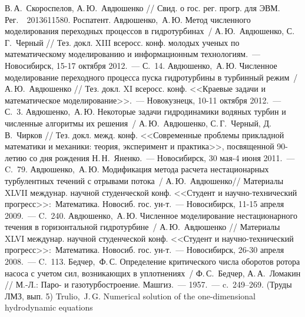 \begin{thebibliography}{999}
               В.\,А.~Скороспелов, А.\,Ю.~Авдюшенко // Свид. о гос. рег. прогр. для ЭВМ. 
               Рег.~\No~2013611580. Роспатент.
\Rus
{} Авдюшенко,~А.\,Ю. Метод численного моделирования переходных 
               процессов в гидротурбинах~/ А.\,Ю.~Авдюшенко, С.\,Г.~Черный //
               Тез. докл. XIII всеросс. конф. молодых ученых по математическому моделированию и информационным 
               технологиям.~--- Новосибирск, 15-17 октября 2012.~--- С.~14.
\Rus
{} Авдюшенко,~А.\,Ю. Численное моделирование переходного процесса пуска гидротурбины 
               в турбинный режим~/ А.\,Ю.~Авдюшенко // 
               Тез. докл. XI всеросс. конф. <<Краевые задачи и математическое моделирование>>.~--- 
               Новокузнецк, 10-11 октября 2012.~--- С.~3. 
\Rus
{} Авдюшенко,~А.\,Ю. Некоторые задачи гидродинамики водяных турбин и численные алгоритмы 
               их решения~/ А.\,Ю.~Авдюшенко, С.\,Г.~Черный, Д.\,В.~Чирков //  Тез. докл. межд. 
               конф. <<Современные проблемы прикладной математики и 
               механики: теория, эксперимент и практика>>, посвященной 90-летию со дня 
               рождения Н.\,Н.~Яненко.~--- Новосибирск, 30 мая-4 июня 2011.~--- C.~79. 
\Rus
{} Авдюшенко,~А.\,Ю. Модификация метода расчета нестационарных турбулентных течений 
               с отрывами потока~/ А.\,Ю.~Авдюшенко// Материалы XLVII междунар. научной студенческой 
               конф. <<Студент и научно-технический прогресс>>:~Математика. Новосиб. гос. ун-т.~--- 
               Новосибирск, 11-15 апреля 2009.~--- C.~240.           
\Rus
{} Авдюшенко,~А.\,Ю. Численное моделирование нестационарного течения в 
               горизонтальной гидротурбине~/ А.\,Ю.~Авдюшенко // Материалы XLVI междунар. научной 
               студенческой конф. <<Студент и научно-технический прогресс>>:~Математика. 
               Новосиб. гос. ун-т.~--- Новосибирск, 26-30 апреля 2008.~--- C.~113.
\Rus
{} Бедчер,~Ф.\,С. Определение критического числа оборотов ротора насоса с учетом
                  сил, возникающих в уплотнениях~/ Ф.\,С.~Бедчер, А.\,А.~Ломакин // М.-Л.: Паро- и 
                  газотурбостроение. Машгиз.~--- 1957.~--- c.~249--269. (Труды ЛМЗ, вып. 5)
%
\Eng
{}Trulio,~J.\,G. Numerical solution of the one-dimensional hydrodynamic equations

\end{thebibliography}
